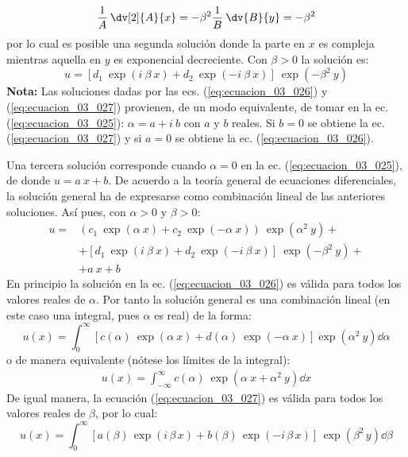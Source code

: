 \[ \dfrac{1}{A} \: \dv[2]{A}{x} = - \beta^{2} \\[1em]
\dfrac{1}{B} \: \dv{B}{y} = -\beta^{2}\]
por lo cual es posible una segunda solución donde la parte en $x$ es compleja mientras aquella en $y$ es exponencial decreciente. Con $\beta > 0$ la solución es:
\begin{equation}
u = \left[ d_{1} \: \exp(i \: \beta \: x) + d_{2} \: \exp(-i \: \beta \: x) \right] \: \exp(-\beta^{2} \: y)
\label{eq:ecuacion_03_027}
\end{equation}
\textbf{Nota: } Las soluciones dadas por las ecs. (\ref{eq:ecuacion_03_026}) y (\ref{eq:ecuacion_03_027}) provienen, de un modo equivalente, de tomar en la ec. (\ref{eq:ecuacion_03_025}): $\alpha = a + i \: b$ con $a$ y $b$ reales. Si $b = 0$ se obtiene la ec. (\ref{eq:ecuacion_03_027}) y si $a = 0$ se obtiene la ec. (\ref{eq:ecuacion_03_026}).
\par
Una tercera solución corresponde cuando $\alpha = 0$ en la ec. (\ref{eq:ecuacion_03_025}), de donde $u = a \: x + b.$
De acuerdo a la teoría general de ecuaciones diferenciales, la solución general ha de expresarse como combinación lineal de las anteriores soluciones. Así pues, con $\alpha > 0$ y $\beta > 0$:
\begin{align*}
u = &\left( c_{1} \: \exp(\alpha \: x) + c_{2} \: \exp(-\alpha \: x) \right) \: \exp(\alpha^{2} \: y) + \\
&+ \left[ d_{1} \: \exp(i \: \beta \: x) + d_{2} \: \exp(-i \: \beta \: x) \right] \: \exp(-\beta^{2} \: y) + \\
&+ a \: x + b
\end{align*}
En principio la solución en la ec. (\ref{eq:ecuacion_03_026}) es válida para todos los valores reales de $\alpha$. Por
tanto la solución general es una combinación lineal (en este caso una integral, pues $\alpha$ es real) de la forma:
\begin{equation}
u(x) = \int_{0}^{\infty} \left[ c(\alpha) \: \exp(\alpha \: x) + d(\alpha) \: \exp(- \alpha \: x) \right] \exp(\alpha^{2} \: y) \dd{\alpha}
\label{eq:ecuacion_03_028}
\end{equation}
o de manera equivalente (nótese los límites de la integral):
\begin{align*} 
u(x) = \int_{-\infty}^{\infty} c(\alpha) \: \exp(\alpha \: x + \alpha^{2} \: y) \dd{x}
\end{align*}
De igual manera, la ecuación (\ref{eq:ecuacion_03_027}) es válida para todos los valores reales de $\beta$, por lo cual:
\begin{equation}
u(x) = \int_{0}^{\infty} \left[ a(\beta) \, \exp(i \, \beta \, x) + b(\beta) \, \exp(- i \, \beta \, x) \right] \, \exp(\beta^{2} \, y) \dd{\beta}
\label{eq:ecuacion_03_029}
\end{equation}
